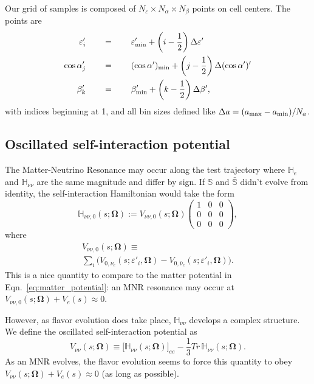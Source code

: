 \documentclass[aps,prd,twocolumn,superscriptaddress,groupedaddress]{revtex4}
\begin{document}
Our grid of samples is composed of
$N_\varepsilon \times N_\alpha \times N_\beta$ points on cell centers.
The points are
\begin{align}
  \varepsilon'_i \qquad&=\qquad \varepsilon'_{\rm min}
  +\left(i-\frac{1}{2}\right)\Delta\varepsilon' \nonumber \\
  \cos\alpha'_j  \qquad&=\qquad (\cos\alpha')_{\rm min}
  +\left(j-\frac{1}{2}\right)\Delta(\cos\alpha')' \nonumber \\
  \beta'_k       \qquad&=\qquad \beta'_{\rm min}
  +\left(k-\frac{1}{2}\right)\Delta\beta', \nonumber
\end{align}
with indices beginning at 1, and all bin sizes defined like
$\Delta a=(a_{\rm max}-a_{\rm min})/N_a$.

\subsection*{Oscillated self-interaction potential}
The Matter-Neutrino Resonance may occur along the test trajectory
where $\mathbb{H}_e$ and $\mathbb{H}_{\nu\nu}$ are the same
magnitude and differ by sign. If $\mathbb{S}$ and $\bar{\mathbb{S}}$ didn't
evolve from identity, the self-interaction Hamiltonian would take the form
\begin{equation}
  \mathbb{H}_{\nu\nu,0}(s;\bm{\Omega}) :=
  V_{\nu\nu,0}(s;\bm{\Omega})
  \left(
  \begin{matrix}
    1 & 0 & 0 \\
    0 & 0 & 0 \\
    0 & 0 & 0
  \end{matrix}
  \right),
\end{equation}
where
\begin{multline}
  V_{\nu\nu,0}(s;\bm{\Omega}) \equiv \\
  \sum\limits_i
  \big(V_{0,\nu_e}(s;\varepsilon'_i,\bm{\Omega})
  -V_{0,\bar{\nu}_e}(s;\varepsilon'_i,\bm{\Omega})\big).
\end{multline}
This is a nice quantity to compare to the matter potential
in Eqn.~\ref{eq:matter_potential}: an MNR resonance may occur at
$V_{\nu\nu,0}(s;\bm{\Omega})+V_e(s)\approx0$.

However, as flavor evolution does take place, $\mathbb{H}_{\nu\nu}$
develops a complex structure.
We define the oscillated self-interaction potential as
\begin{equation}
  V_{\nu\nu}(s;\bm{\Omega}) \equiv
  \big[\mathbb{H}_{\nu\nu}(s;\bm{\Omega})\big]_{ee}
  - \frac{1}{3}Tr\,\mathbb{H}_{\nu\nu}(s;\bm{\Omega}).
\end{equation}
As an MNR evolves, the flavor evolution seems to force this quantity to obey
$V_{\nu\nu}(s;\bm{\Omega})+V_e(s)\approx0$
(as long as possible).


\end{document}
